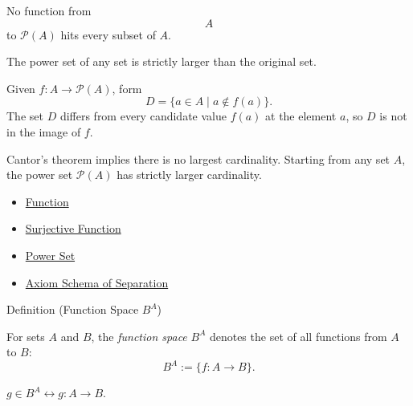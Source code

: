 \begin{remark*}
No function from \[
  A
\] to $\mathcal{P}(A)$ hits every subset of $A$.
\end{remark*}

\begin{remark*}[Interpretation]
The power set of any set is strictly larger than the original set.
\end{remark*}

\begin{remark*}[Exposition]
Given $f:A\to\mathcal{P}(A)$, form
\[
D=\{a\in A\mid a\notin f(a)\}.
\]
The set $D$ differs from every candidate value $f(a)$ at the element $a$, so
$D$ is not in the image of $f$.
\end{remark*}

\begin{remark*}[Exposition]
Cantor's theorem implies there is no largest cardinality. Starting from any
set $A$, the power set $\mathcal{P}(A)$ has strictly larger cardinality.
\end{remark*}

\begin{dependencies}
\begin{itemize}
  \item \hyperref[def:function]{Function}
  \item \hyperref[def:surjective]{Surjective Function}
  \item \hyperref[def:power-set]{Power Set}
  \item \hyperref[ax:separation]{Axiom Schema of Separation}
\end{itemize}
\end{dependencies}


\begin{definitionbox}{Definition (Function Space $B^A$)}
\begin{definition}\label{def:function-space}
For sets $A$ and $B$, the \emph{function space} $B^A$ denotes the set of all
functions from $A$ to $B$:
\[
B^A:=\{f:A\to B\}.
\]
\end{definition}
\end{definitionbox}

\begin{remark*}
$g\in B^A\leftrightarrow g:A\to B$.
\end{remark*}

